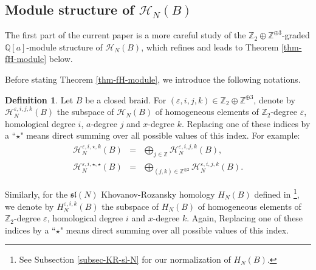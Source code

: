\documentclass{amsart}
\theoremstyle{plain}
\theoremstyle{definition}
\newtheorem{definition}[theorem]{Definition}
\theoremstyle{remark}
\numberwithin{equation}{section}
\begin{document}
\subsection{Module structure of ${\mathcal{H}}_N(B)$} The first part of the current paper is a more careful study of the ${\mathbb{Z}}_2 \oplus {\mathbb{Z}}^{\oplus 3}$-graded ${\mathbb{Q}}[a]$-module structure of ${\mathcal{H}}_N(B)$, which refines \cite[Theorem 1.11]{Wu-triple-trans} and leads to Theorem \ref{thm-fH-module} below. 

Before stating Theorem \ref{thm-fH-module}, we introduce the following notations.

\begin{definition}\label{def-component-notations}
Let $B$ be a closed braid. For $({\varepsilon},i,j,k) \in {\mathbb{Z}}_2 \oplus {\mathbb{Z}}^{\oplus 3}$, denote by ${\mathcal{H}}_N^{{\varepsilon},i,j,k}(B)$ the subspace of ${\mathcal{H}}_N(B)$ of homogeneous elements of ${\mathbb{Z}}_2$-degree ${\varepsilon}$, homological degree $i$, $a$-degree $j$ and $x$-degree $k$. Replacing one of these indices by a ``$\star$" means direct summing over all possible values of this index. For example:
\begin{eqnarray*}
{\mathcal{H}}_N^{{\varepsilon},i,\star,k}(B) & = & \bigoplus_{j\in{\mathbb{Z}}} {\mathcal{H}}_N^{{\varepsilon},i,j,k}(B), \\
{\mathcal{H}}_N^{{\varepsilon},i,\star,\star} (B) & = & \bigoplus_{(j,k)\in{\mathbb{Z}}^{\oplus 2}} {\mathcal{H}}_N^{{\varepsilon},i,j,k}(B).
\end{eqnarray*}

Similarly, for the ${\mathfrak{sl}}(N)$ Khovanov-Rozansky homology $H_N(B)$ defined in \cite{KR1}\footnote{See Subsection \ref{subsec-KR-sl-N} for our normalization of $H_N(B)$.}, we denote by $H_N^{{\varepsilon},i,k}(B)$ the subspace of $H_N(B)$ of homogeneous elements of ${\mathbb{Z}}_2$-degree ${\varepsilon}$, homological degree $i$ and $x$-degree $k$. Again, Replacing one of these indices by a ``$\star$" means direct summing over all possible values of this index.
\end{definition}
\end{document}
